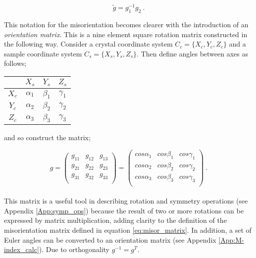 \documentclass[a4paper,12pt,twoside]{report}
\numberwithin{equation}{chapter}
\begin{document}
\begin{equation} \label{eq:misor_matrix}
\tilde{g} = g_1^{-1}g_2\ .
\end{equation} 

This notation for the misorientation becomes clearer with the introduction of an \emph{orientation matrix}. This is a nine element square rotation matrix constructed in the following way. Consider a crystal coordinate system $C_c = \{X_c,Y_c,Z_c\}$ and a sample coordinate system $C_s = \{X_s,Y_s,Z_s\}$. Then define angles between axes as follows;

\begin{table}[h!]
    \centering
	\begin{tabular}{c | c c c}

	  & $X_s$      & $Y_s$      & $Z_s$ \\
\hline
$X_c$ & $\alpha_1$ & $\beta_1$ & $\gamma_1$ \\
$Y_c$ & $\alpha_2$ & $\beta_2$ & $\gamma_2$ \\
$Z_c$ & $\alpha_3$ & $\beta_3$ & $\gamma_3$ \\

	\end{tabular}
\end{table}
\noindent
and so construct the matrix;

\begin{equation}
g = 
\begin{pmatrix}
g_{11} & g_{12} & g_{13} \\
g_{21} & g_{22} & g_{23} \\
g_{31} & g_{32} & g_{33} \\
\end{pmatrix}
= 
\begin{pmatrix}
cos \alpha_1 & cos \beta_1 & cos \gamma_1 \\
cos \alpha_2 & cos \beta_2 & cos \gamma_2 \\
cos \alpha_3 & cos \beta_3 & cos \gamma_3 \\
\end{pmatrix}\ .
\end{equation}
\\
This matrix is a useful tool in describing rotation and symmetry operations (see Appendix \ref{App:symp_ops}) because the result of two or more rotations can be expressed by matrix multiplication, adding clarity to the definition of the misorientation matrix defined in equation \ref{eq:misor_matrix}. In addition, a set of Euler angles can be converted to an orientation matrix (see Appendix \ref{App:M-index_calc}). Due to orthogonality $g^{-1} = g^T$. 
\end{document}
